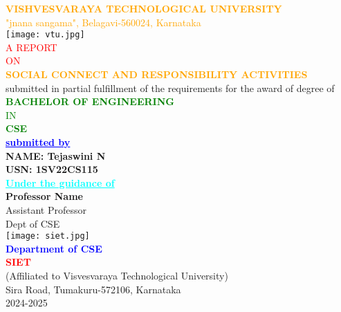 \documentclass[12pt,a4paper]{article}
\begin{document}
\begin{center}
\textcolor{orange}{\large\textbf{VISHVESVARAYA TECHNOLOGICAL UNIVERSITY}\\
"jnana sangama", Belagavi-560024, Karnataka}\\
\vspace{2mm}
\texttt{[image: vtu.jpg]}\\
\vspace{2mm}
\textcolor{red}{A REPORT}\\
\textcolor{red}{ON}\\
\textcolor{orange}{\textbf{SOCIAL CONNECT AND RESPONSIBILITY ACTIVITIES}}\\
\small{submitted in partial fulfillment of the requirements for the award of degree of}\\
\vspace{5mm}
\textcolor{green}{\textbf{BACHELOR OF ENGINEERING}\\
IN\\
\textbf{CSE}}\\ 
\vspace{5mm}
\textcolor{blue}{\underline{\textbf{submitted by}}}\\
\textbf{NAME: Tejaswini N}\\
\textbf{USN: 1SV22CS115}\\
\vspace{5mm}
\textcolor{cyan}{\underline{\textbf{Under the guidance of}}}\\
\large\textbf{Professor Name}\\
Assistant Professor\\
Dept of CSE\\
\texttt{[image: siet.jpg]}\\
\textcolor{blue}{\textbf{Department of CSE}}\\
\textcolor{red}{\textbf{SIET}}\\
(Affiliated to Visvesvaraya Technological University)\\
Sira Road, Tumakuru-572106, Karnataka\\
2024-2025
\end{center}
\end{document}
